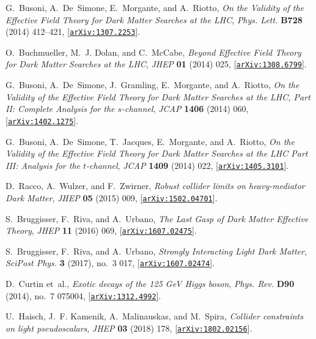 \documentclass[review]{elsarticle}
\begin{document}
\begin{thebibliography}{100}
G.~Busoni, A.~De~Simone, E.~Morgante, and A.~Riotto, {\it {On the Validity of
  the Effective Field Theory for Dark Matter Searches at the LHC}},  {\em Phys.
  Lett.} {\bf B728} (2014) 412--421,
  [\href{http://arxiv.org/abs/1307.2253}{{\tt arXiv:1307.2253}}].

O.~Buchmueller, M.~J. Dolan, and C.~McCabe, {\it {Beyond Effective Field Theory
  for Dark Matter Searches at the LHC}},  {\em JHEP} {\bf 01} (2014) 025,
  [\href{http://arxiv.org/abs/1308.6799}{{\tt arXiv:1308.6799}}].

G.~Busoni, A.~De~Simone, J.~Gramling, E.~Morgante, and A.~Riotto, {\it {On the
  Validity of the Effective Field Theory for Dark Matter Searches at the LHC,
  Part II: Complete Analysis for the $s$-channel}},  {\em JCAP} {\bf 1406}
  (2014) 060, [\href{http://arxiv.org/abs/1402.1275}{{\tt arXiv:1402.1275}}].

G.~Busoni, A.~De~Simone, T.~Jacques, E.~Morgante, and A.~Riotto, {\it {On the
  Validity of the Effective Field Theory for Dark Matter Searches at the LHC
  Part III: Analysis for the $t$-channel}},  {\em JCAP} {\bf 1409} (2014) 022,
  [\href{http://arxiv.org/abs/1405.3101}{{\tt arXiv:1405.3101}}].

D.~Racco, A.~Wulzer, and F.~Zwirner, {\it {Robust collider limits on
  heavy-mediator Dark Matter}},  {\em JHEP} {\bf 05} (2015) 009,
  [\href{http://arxiv.org/abs/1502.04701}{{\tt arXiv:1502.04701}}].

S.~Bruggisser, F.~Riva, and A.~Urbano, {\it {The Last Gasp of Dark Matter
  Effective Theory}},  {\em JHEP} {\bf 11} (2016) 069,
  [\href{http://arxiv.org/abs/1607.02475}{{\tt arXiv:1607.02475}}].

S.~Bruggisser, F.~Riva, and A.~Urbano, {\it {Strongly Interacting Light Dark
  Matter}},  {\em SciPost Phys.} {\bf 3} (2017), no.~3 017,
  [\href{http://arxiv.org/abs/1607.02474}{{\tt arXiv:1607.02474}}].

D.~Curtin et~al., {\it {Exotic decays of the 125 GeV Higgs boson}},  {\em Phys.
  Rev.} {\bf D90} (2014), no.~7 075004,
  [\href{http://arxiv.org/abs/1312.4992}{{\tt arXiv:1312.4992}}].

U.~Haisch, J.~F. Kamenik, A.~Malinauskas, and M.~Spira, {\it {Collider
  constraints on light pseudoscalars}},  {\em JHEP} {\bf 03} (2018) 178,
  [\href{http://arxiv.org/abs/1802.02156}{{\tt arXiv:1802.02156}}].


\end{thebibliography}
\end{document}
